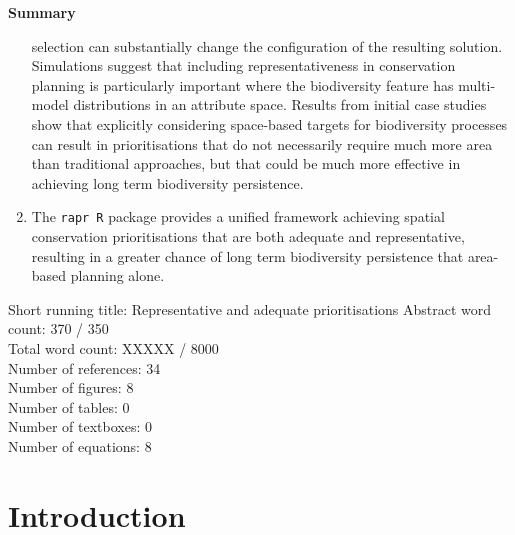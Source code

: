 \documentclass[11pt,]{article}
\renewcommand{\abstractname}{Summary}
\renewenvironment{abstract}
 {\small
  \begin{center}
  \bfseries \abstractname\vspace{-.5em}\vspace{0pt}
  \end{center}
  \list{} {%
   \setlength{\leftmargin}{2mm}
   \setlength{\rightmargin}{\leftmargin}%
  }%
  \item\relax}
{\endlist}
\begin{document}
\begin{abstract}
\begin{enumerate}
  selection can substantially change the configuration of the resulting
  solution. Simulations suggest that including representativeness in
  conservation planning is particularly important where the biodiversity
  feature has multi-model distributions in an attribute space. Results
  from initial case studies show that explicitly considering space-based
  targets for biodiversity processes can result in prioritisations that
  do not necessarily require much more area than traditional approaches,
  but that could be much more effective in achieving long term
  biodiversity persistence.
\item
  The \texttt{rapr R} package provides a unified framework achieving
  spatial conservation prioritisations that are both adequate and
  representative, resulting in a greater chance of long term
  biodiversity persistence that area-based planning alone.
\end{enumerate}
\end{abstract}

Short running title: Representative and adequate prioritisations
\newline
Abstract word count: 370 / 350\\Total word count: XXXXX / 8000\\Number
of references: 34\\Number of figures: 8\\Number of tables: 0\\Number of
textboxes: 0\\Number of equations: 8\\\newpage

\section{Introduction}\label{introduction}
\end{document}
